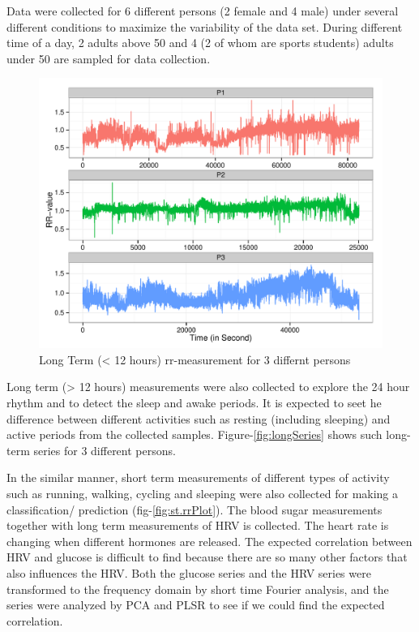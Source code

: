 \documentclass[a4paper, 11pt]{report}\usepackage[]{graphicx}\usepackage[]{color}
\makeatletter
\def\maxwidth{ %
  \ifdim\Gin@nat@width>\linewidth
    \linewidth
  \else
    \Gin@nat@width
  \fi
}
\newenvironment{knitrout}{}{} %
\numberwithin{figure}{section}
\makeatother
\begin{document}
Data were collected for 6 different persons (2 female and 4 male) under several different conditions to maximize the variability of the data set. During different time of a day, 2 adults above 50 and 4 (2 of whom are sports students) adults under 50 are sampled for data collection.


\begin{knitrout}
\color{fgcolor}\begin{figure}[H]
\includegraphics[width=\maxwidth]{figure/longSeriesPlot-1} \caption[Long Term (< 12 hours) rr-measurement for 3 differnt persons]{Long Term (< 12 hours) rr-measurement for 3 differnt persons}\label{fig:longSeriesPlot}
\end{figure}


\end{knitrout}


Long term (> 12 hours) measurements were also collected to explore the 24 hour rhythm and to detect the sleep and awake periods. It is expected to seet he difference between different activities such as resting (including sleeping) and active periods from the collected samples. Figure-\ref{fig:longSeries} shows such long-term series for 3 different persons.

In the similar manner, short term measurements of different types of activity such as running, walking, cycling and sleeping were also collected for making a classification/ prediction (fig-\ref{fig:st.rrPlot}). The blood sugar measurements together with long term measurements of HRV is collected. The heart rate is changing when different hormones are released. The expected correlation between HRV and glucose is difficult to find because there are so many other factors that also influences the HRV. Both the glucose series and the HRV series were transformed to the frequency domain by short time Fourier analysis, and the series were analyzed by PCA and PLSR to see if we could find the expected correlation.
\end{document}
